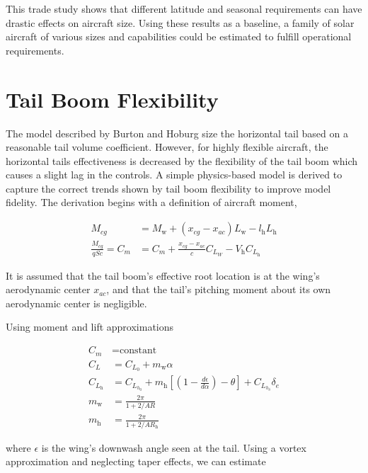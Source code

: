 \documentclass[]{aiaa-tc}%
\begin{document}
This trade study shows that different latitude and seasonal requirements can have drastic effects on aircraft size.  
Using these results as a baseline, a family of solar aircraft of various sizes and capabilities could be estimated to fulfill operational requirements. 

\section{Tail Boom Flexibility}

The model described by Burton and Hoburg size the horizontal tail based on a reasonable tail volume coefficient.\cite{burton_solar_2017}  
However, for highly flexible aircraft, the horizontal tails effectiveness is decreased by the flexibility of the tail boom which causes a slight lag in the controls.\cite{warren_mech}
A simple physics-based model is derived to capture the correct trends shown by tail boom flexibility to improve model fidelity. 
The derivation begins with a definition of aircraft moment, 

\begin{align}
    \label{e:mcenter}
    M_{cg} &= M_{\text{w}} + (x_{cg} - x_{ac})L_{\text{w}} - l_{\text{h}} L_{\text{h}} \\
    \label{e:eq6}
    \frac{M_{cg}}{qSc} = C_m &= C_m + \frac{x_{cg} - x_{ac}}{c} C_{L_W} - V_{\text{h}} C_{L_{\text{h}}}
\end{align}

It is assumed that the tail boom's effective root location is at the wing's aerodynamic center $x_{ac}$, and that the tail's pitching moment about its own aerodynamic center is negligible. 

Using moment and lift approximations

\begin{align}
    C_{m} &= \text{constant} \\
    C_{L} &= C_{L_0} + m_{\text{w}} \alpha \\
    \label{e:eq10}
    C_{L_{\text{h}}} &= C_{L_{h_0}} + m_{\text{h}} \left[\left( 1 - \frac{d\epsilon}{d\alpha}\right) - \theta \right] + C_{L_{h_{\delta}}}\delta_e \\
    \label{e:mw}
    m_{\text{w}} &= \frac{2\pi}{1 + 2/AR} \\
    m_{\text{h}} &= \frac{2\pi}{1 + 2/AR_{\text{h}}}
\end{align}

where $\epsilon$ is the wing's downwash angle seen at the tail. Using a vortex approximation and neglecting taper effects, we can estimate
\end{document}
